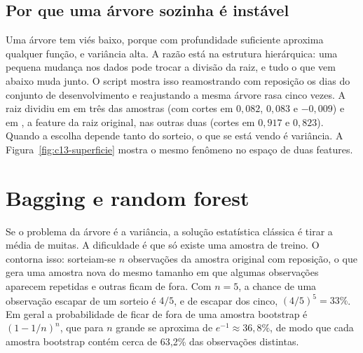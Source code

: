 \subsection{Por que uma árvore sozinha é instável}

Uma árvore tem viés baixo, porque com profundidade suficiente aproxima qualquer função, e variância alta. A razão está na estrutura hierárquica: uma pequena mudança nos dados pode trocar a divisão da raiz, e tudo o que vem abaixo muda junto. O script  mostra isso reamostrando com reposição os dias do conjunto de desenvolvimento e reajustando a mesma árvore rasa cinco vezes. A raiz dividiu em  em três das amostras (com cortes em $0,082$, $0,083$ e $-0,009$) e em , a feature da raiz original, nas outras duas (cortes em $0,917$ e $0,823$). Quando a escolha depende tanto do sorteio, o que se está vendo é variância. A Figura~\ref{fig:c13-superficie} mostra o mesmo fenômeno no espaço de duas features.


\section{Bagging e random forest}
\label{sec:c13-rf}

Se o problema da árvore é a variância, a solução estatística clássica é tirar a média de muitas. A dificuldade é que só existe uma amostra de treino. O  contorna isso: sorteiam-se $n$ observações da amostra original com reposição, o que gera uma amostra nova do mesmo tamanho em que algumas observações aparecem repetidas e outras ficam de fora. Com $n = 5$, a chance de uma observação escapar de um sorteio é $4/5$, e de escapar dos cinco, $(4/5)^5 = 33\%$. Em geral a probabilidade de ficar de fora de uma amostra bootstrap é $(1 - 1/n)^n$, que para $n$ grande se aproxima de $e^{-1} \approx 36,8\%$, de modo que cada amostra bootstrap contém cerca de 63,2\% das observações distintas.

